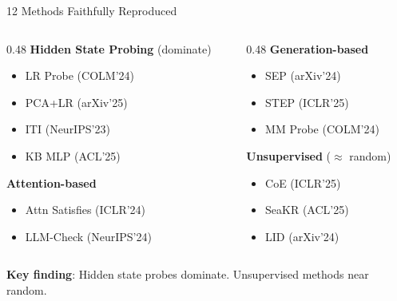 \documentclass[aspectratio=169,14pt]{beamer}
\begin{document}
\begin{frame}{12 Methods Faithfully Reproduced}

\small
\begin{columns}[T]
\begin{column}{0.48\textwidth}
\textbf{Hidden State Probing} (dominate)
\begin{itemize}
    \item LR Probe {\scriptsize (COLM'24)}
    \item PCA+LR {\scriptsize (arXiv'25)}
    \item ITI {\scriptsize (NeurIPS'23)}
    \item KB MLP {\scriptsize (ACL'25)}
\end{itemize}

\textbf{Attention-based}
\begin{itemize}
    \item Attn Satisfies {\scriptsize (ICLR'24)}
    \item LLM-Check {\scriptsize (NeurIPS'24)}
\end{itemize}
\end{column}

\begin{column}{0.48\textwidth}
\textbf{Generation-based}
\begin{itemize}
    \item SEP {\scriptsize (arXiv'24)}
    \item STEP {\scriptsize (ICLR'25)}
    \item MM Probe {\scriptsize (COLM'24)}
\end{itemize}

\textbf{Unsupervised} ($\approx$ random)
\begin{itemize}
    \item CoE {\scriptsize (ICLR'25)}
    \item SeaKR {\scriptsize (ACL'25)}
    \item LID {\scriptsize (arXiv'24)}
\end{itemize}
\end{column}
\end{columns}

\vspace{0.8em}
\centering
\textcolor{primary}{\textbf{Key finding}}: Hidden state probes dominate. Unsupervised methods near random.

\end{frame}
\end{document}
